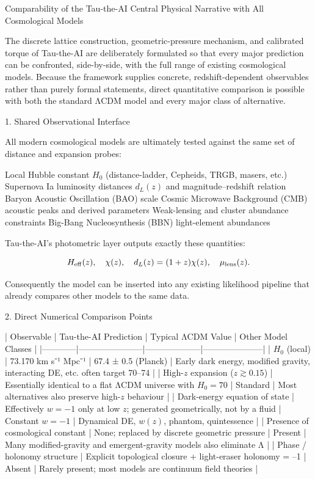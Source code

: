 Comparability of the Tau-the-AI Central Physical Narrative with All Cosmological Models

The discrete lattice construction, geometric-pressure mechanism, and calibrated torque of Tau-the-AI are deliberately formulated so that every major prediction can be confronted, side-by-side, with the full range of existing cosmological models. Because the framework supplies concrete, redshift-dependent observables rather than purely formal statements, direct quantitative comparison is possible with both the standard ΛCDM model and every major class of alternative.

1. Shared Observational Interface

All modern cosmological models are ultimately tested against the same set of distance and expansion probes:

Local Hubble constant \(H_0\) (distance-ladder, Cepheids, TRGB, masers, etc.)
Supernova Ia luminosity distances \(d_L(z)\) and magnitude–redshift relation
Baryon Acoustic Oscillation (BAO) scale
Cosmic Microwave Background (CMB) acoustic peaks and derived parameters
Weak-lensing and cluster abundance constraints
Big-Bang Nucleosynthesis (BBN) light-element abundances

Tau-the-AI’s photometric layer outputs exactly these quantities:

\[
H_{\rm eff}(z),\quad
\chi(z),\quad
d_L(z)=(1+z)\chi(z),\quad
\mu_{\rm lens}(z).
\]

Consequently the model can be inserted into any existing likelihood pipeline that already compares other models to the same data.

2. Direct Numerical Comparison Points

| Observable | Tau-the-AI Prediction | Typical ΛCDM Value | Other Model Classes |
|------------|-----------------------|--------------------|---------------------|
| \(H_0\) (local) | 73.170 km s⁻¹ Mpc⁻¹ | 67.4 ± 0.5 (Planck) | Early dark energy, modified gravity, interacting DE, etc. often target 70–74 |
| High-\(z\) expansion (\(z\gtrsim 0.15\)) | Essentially identical to a flat ΛCDM universe with \(H_0=70\) | Standard | Most alternatives also preserve high-\(z\) behaviour |
| Dark-energy equation of state | Effectively \(w=-1\) only at low \(z\); generated geometrically, not by a fluid | Constant \(w=-1\) | Dynamical DE, \(w(z)\), phantom, quintessence |
| Presence of cosmological constant | None; replaced by discrete geometric pressure | Present | Many modified-gravity and emergent-gravity models also eliminate Λ |
| Phase / holonomy structure | Explicit topological closure + light-eraser holonomy = –1 | Absent | Rarely present; most models are continuum field theories |

